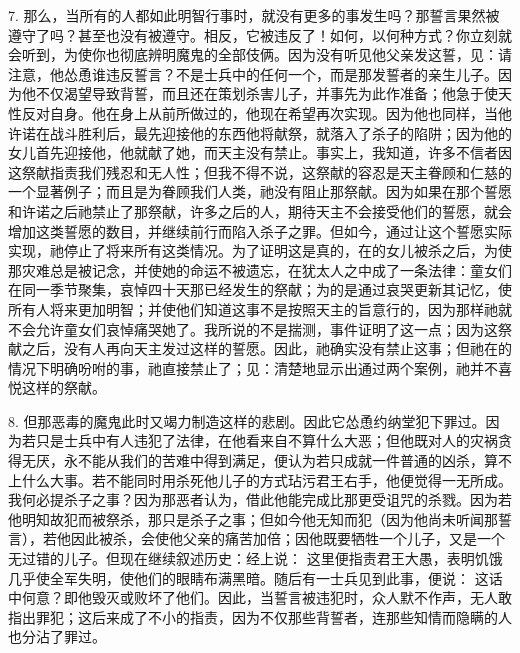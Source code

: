 7. 那么，当所有的人都如此明智行事时，就没有更多的事发生吗？那誓言果然被遵守了吗？甚至也没有被遵守。相反，它被违反了！如何，以何种方式？你立刻就会听到，为使你也彻底辨明魔鬼的全部伎俩。因为没有听见他父亲发这誓，见：请注意，他怂恿谁违反誓言？不是士兵中的任何一个，而是那发誓者的亲生儿子。因为他不仅渴望导致背誓，而且还在策划杀害儿子，并事先为此作准备；他急于使天性反对自身。他在身上从前所做过的，他现在希望再次实现。因为他也同样，当他许诺在战斗胜利后，最先迎接他的东西他将献祭，就落入了杀子的陷阱；因为他的女儿首先迎接他，他就献了她，而天主没有禁止。事实上，我知道，许多不信者因这祭献指责我们残忍和无人性；但我不得不说，这祭献的容忍是天主眷顾和仁慈的一个显著例子；而且是为眷顾我们人类，祂没有阻止那祭献。因为如果在那个誓愿和许诺之后祂禁止了那祭献，许多之后的人，期待天主不会接受他们的誓愿，就会增加这类誓愿的数目，并继续前行而陷入杀子之罪。但如今，通过让这个誓愿实际实现，祂停止了将来所有这类情况。为了证明这是真的，在的女儿被杀之后，为使那灾难总是被记念，并使她的命运不被遗忘，在犹太人之中成了一条法律：童女们在同一季节聚集，哀悼四十天那已经发生的祭献；为的是通过哀哭更新其记忆，使所有人将来更加明智；并使他们知道这事不是按照天主的旨意行的，因为那样祂就不会允许童女们哀悼痛哭她了。我所说的不是揣测，事件证明了这一点；因为这祭献之后，没有人再向天主发过这样的誓愿。因此，祂确实没有禁止这事；但祂在的情况下明确吩咐的事，祂直接禁止了；见：清楚地显示出通过两个案例，祂并不喜悦这样的祭献。\par

8. 但那恶毒的魔鬼此时又竭力制造这样的悲剧。因此它怂恿约纳堂犯下罪过。因为若只是士兵中有人违犯了法律，在他看来自不算什么大恶；但他既对人的灾祸贪得无厌，永不能从我们的苦难中得到满足，便认为若只成就一件普通的凶杀，算不上什么大事。若不能同时用杀死他儿子的方式玷污君王右手，他便觉得一无所成。我何必提杀子之事？因为那恶者认为，借此他能完成比那更受诅咒的杀戮。因为若他明知故犯而被祭杀，那只是杀子之事；但如今他无知而犯（因为他尚未听闻那誓言），若他因此被杀，会使他父亲的痛苦加倍；因他既要牺牲一个儿子，又是一个无过错的儿子。但现在继续叙述历史：经上说：  这里便指责君王大愚，表明饥饿几乎使全军失明，使他们的眼睛布满黑暗。随后有一士兵见到此事，便说： 这话中何意？即他毁灭或败坏了他们。因此，当誓言被违犯时，众人默不作声，无人敢指出罪犯；这后来成了不小的指责，因为不仅那些背誓者，连那些知情而隐瞒的人也分沾了罪过。\par

